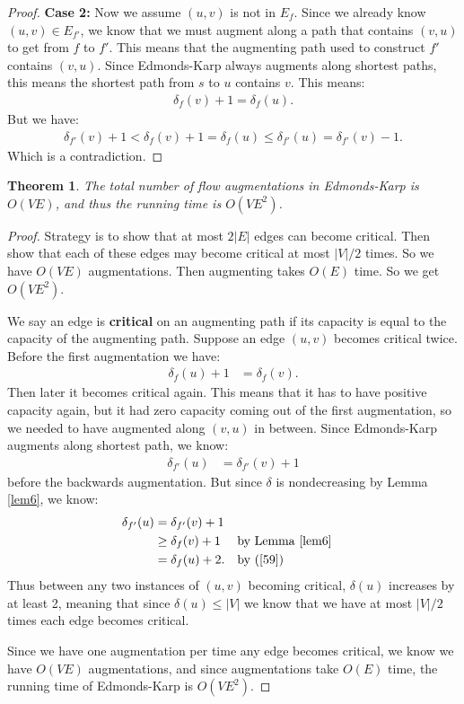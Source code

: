 \documentclass[reqno]{amsbook}
\theoremstyle{plain}
\newtheorem{theorem}{Theorem}[chapter]
\numberwithin{section}{chapter}
\numberwithin{equation}{chapter}
\theoremstyle{definition}
\theoremstyle{remark}
\newcommand{\bb}{\vspace{3mm}}
\newcommand{\bee}{\begin{equation}\begin{aligned}}
\newcommand{\eee}{\end{aligned}\end{equation}}
\begin{document}
\begin{proof}
\textbf{Case 2: }Now we assume $(u,v)$ is not in $E_f$. Since we already know $(u,v) \in E_{f'}$, we know that we must augment along a path that contains $(v,u)$ to get from $f$ to $f'$. This means that the augmenting path used to construct $f'$ contains $(v,u)$. Since Edmonds-Karp always augments along shortest paths, this means the shortest path from $s$ to $u$ contains $v$. This means:
\bee
\delta_{f}(v) + 1 = \delta_{f}(u).
\eee
But we have:
\bee
\delta_{f'}(v) + 1 < \delta_{f}(v) + 1 = \delta_{f}(u) \leq \delta_{f'}(u) = \delta_{f'}(v) - 1.
\eee
Which is a contradiction. 
\end{proof}

\begin{theorem}
The total number of flow augmentations in Edmonds-Karp is $O(VE)$, and thus the running time is $O(VE^2)$. 
\end{theorem}

\begin{proof}
Strategy is to show that at most $2|E|$ edges can become critical. Then show that each of these edges may become critical at most $|V|/2$ times. So we have $O(VE)$ augmentations. Then augmenting takes $O(E)$ time. So we get $O(VE^2)$. 



We say an edge is \textbf{critical} on an augmenting path if its capacity is equal to the capacity of the augmenting path. Suppose an edge $(u,v)$ becomes critical twice. Before the first augmentation we have:
\bee \label{59}
\delta_f(u) + 1 &= \delta_f(v).
\eee
Then later it becomes critical again. This means that it has to have positive capacity again, but it had zero capacity coming out of the first augmentation, so we needed to have augmented along $(v,u)$ in between. Since Edmonds-Karp augments along shortest path, we know:
\bee
\delta_{f'}(u) &= \delta_{f'}(v) + 1
\eee
before the backwards augmentation. But since $\delta$ is nondecreasing by Lemma \ref{lem6}, we know:
\bee
\delta_{f'}(u) &= \delta_{f'}(v) + 1 \\
&\geq \delta_f(v) + 1 && \text{by Lemma \ref{lem6}}\\
&= \delta_f(u) + 2. && \text{by (\ref{59})}
\eee
Thus between any two instances of $(u,v)$ becoming critical, $\delta(u)$ increases by at least 2, meaning that since $\delta(u) \leq |V|$ we know that we have at most $|V|/2$ times each edge becomes critical. 
\bb

Since we have one augmentation per time any edge becomes critical, we know we have $O(VE)$ augmentations, and since augmentations take $O(E)$ time, the running time of Edmonds-Karp is $O(VE^2)$. 
\end{proof}
\end{document}
